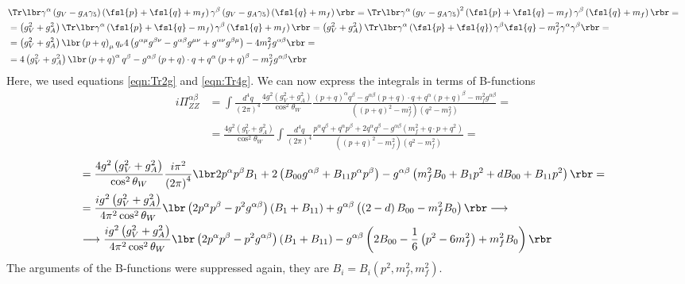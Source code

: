 \begin{align*}
& \Tr \lbr \gamma^{\alpha} \left( g_V - g_A \gamma_5 \right) \left( \fsl{p}+\fsl{q}+m_f \right) \gamma^{\beta} \left( g_V - g_A \gamma_5 \right) \left( \fsl{q}+m_f \right) \rbr = \Tr \lbr \gamma^{\alpha} \left( g_V - g_A \gamma_5 \right)^2 \left( \fsl{p}+\fsl{q}-m_f \right) \gamma^{\beta} \left( \fsl{q}+m_f \right) \rbr = & \\
& = \left( g_V^2 + g_A^2 \right) \Tr \lbr \gamma^{\alpha} \left( \fsl{p} + \fsl{q} - m_f \right) \gamma^{\beta} \left( \fsl{q} + m_f \right) \rbr = \left( g_V^2 + g_A^2 \right) \Tr \lbr \gamma^{\alpha} \left( \fsl{p} + \fsl{q} \right) \gamma^{\beta} \fsl{q} - m^2_f \gamma^{\alpha}\gamma^{\beta} \rbr = & \\
& = \left( g_V^2 + g_A^2 \right) \lbr \left( p+q \right)_{\mu} q_{\nu} 4 \left( g^{\alpha\mu}g^{\beta\nu} - g^{\alpha\beta}g^{\mu\nu} + g^{\alpha\nu}g^{\beta\mu} \right) - 4m^2_f g^{\alpha\beta} \rbr = & \\
& = 4 \left( g_V^2 + g_A^2 \right) \lbr \left( p+q \right)^{\alpha}q^{\beta} - g^{\alpha\beta} \left( p+q \right) \cdot q + q^{\alpha} \left( p+q \right)^{\beta} - m^2_f g^{\alpha\beta} \rbr &
\end{align*}
Here, we used equations \ref{eqn:Tr2g} and \ref{eqn:Tr4g}. We can now express the integrals in terms of B-functions
\begin{align*}
i\Pi^{\alpha\beta}_{ZZ} & = \int \frac{d^4q}{\left( 2\pi \right)^4} \frac{4g^2\left(g_V^2 + g_A^2 \right)}{\cos^2\theta_W} \frac{\left( p+q \right)^{\alpha}q^{\beta} - g^{\alpha\beta} \left( p+q \right) \cdot q + q^{\alpha} \left( p+q \right)^{\beta} - m^2_f g^{\alpha\beta}}{\left( \left( p+q \right)^2 -m^2_f \right) \left( q^2 - m^2_f \right)} = & \\
& = \frac{4g^2\left(g_V^2 + g_A^2 \right)}{\cos^2\theta_W} \int \frac{d^4q}{\left( 2\pi \right)^4} \frac{p^{\alpha}q^{\beta}+q^{\alpha}p^{\beta}+2q^{\alpha}q^{\beta} - g^{\alpha\beta} \left( m^2_f + q \cdot p + q^2 \right)}{\left( \left( p+q \right)^2 -m^2_f \right) \left( q^2 - m^2_f \right)} = & 
\end{align*}
\begin{align*}
& = \frac{4g^2\left(g_V^2 + g_A^2 \right)}{\cos^2\theta_W} \frac{i\pi^2}{\left( 2\pi \right)^4} \lbr 2 p^{\alpha}p^{\beta} B_1 + 2 \left( B_{00} g^{\alpha\beta} + B_{11} p^{\alpha}p^{\beta} \right) - g^{\alpha\beta} \left( m^2_f B_0 + B_1 p^2 + d B_{00} + B_{11} p^2 \right) \rbr = & \\
& = \frac{ig^2\left(g_V^2 + g_A^2 \right)}{4\pi^2\cos^2\theta_W} \lbr \left( 2p^{\alpha}p^{\beta} -p^2 g^{\alpha\beta} \right) \left( B_1 + B_{11} \right) + g^{\alpha\beta} \left( \left( 2-d \right) B_{00} - m^2_f B_0  \right) \rbr \longrightarrow & \\
& \longrightarrow \frac{ig^2\left(g_V^2 + g_A^2 \right)}{4\pi^2\cos^2\theta_W} \lbr \left( 2p^{\alpha}p^{\beta} -p^2 g^{\alpha\beta} \right) \left( B_1 + B_{11} \right) - g^{\alpha\beta} \left( 2 B_{00} - \frac{1}{6} \left( p^2 - 6m^2_f \right) + m^2_f B_0  \right) \rbr
\end{align*}
The arguments of the B-functions were suppressed again, they are $B_i = B_i(p^2,m^2_f,m^2_f)$. \\

